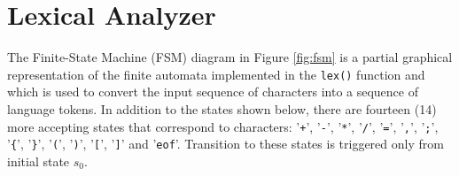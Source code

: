 \documentclass{article}
\def\code#1{\texttt{#1}} %
\begin{document}
\pagebreak



\section{Lexical Analyzer}

The Finite-State Machine (FSM) diagram in Figure \ref{fig:fsm} is a partial graphical representation of the
finite automata implemented in the \code{lex()} function and which is used to convert the input
sequence of characters into a sequence of language tokens. In addition to the states shown below,
there are fourteen (14) more accepting states that correspond to characters: '\code{+}', '\code{-}', '\code{*}', 
'\code{/}', '\code{=}', '\code{,}', '\code{;}', '\code{\{}', '\code{\}}', '\code{(}', '\code{)}', 
'\code{[}', '\code{]}' and '\code{eof}'. Transition to these states is triggered only from initial state $s_0$.
\vspace{1cm}
\end{document}
